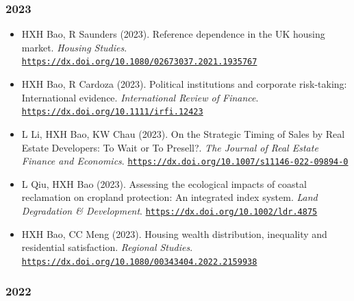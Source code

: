 \documentclass[11pt,a4paper]{article}
\providecommand{\tightlist}{%
  \setlength{\itemsep}{1pt}\setlength{\parskip}{0pt}}
\begin{document}
\subsubsection{2023}\label{section-3}

\begin{itemize}
\tightlist
\item
  HXH Bao, R Saunders (2023). Reference dependence in the UK housing
  market. \emph{Housing Studies}.
  \href{https://dx.doi.org/10.1080/02673037.2021.1935767}{\nolinkurl{https://dx.doi.org/10.1080/02673037.2021.1935767}}
\item
  HXH Bao, R Cardoza (2023). Political institutions and corporate
  risk-taking: International evidence. \emph{International Review of
  Finance}.
  \href{https://dx.doi.org/10.1111/irfi.12423}{\nolinkurl{https://dx.doi.org/10.1111/irfi.12423}}
\item
  L Li, HXH Bao, KW Chau (2023). On the Strategic Timing of Sales by
  Real Estate Developers: To Wait or To Presell?. \emph{The Journal of
  Real Estate Finance and Economics}.
  \href{https://dx.doi.org/10.1007/s11146-022-09894-0}{\nolinkurl{https://dx.doi.org/10.1007/s11146-022-09894-0}}
\item
  L Qiu, HXH Bao (2023). Assessing the ecological impacts of coastal
  reclamation on cropland protection: An integrated index system.
  \emph{Land Degradation \& Development}.
  \href{https://dx.doi.org/10.1002/ldr.4875}{\nolinkurl{https://dx.doi.org/10.1002/ldr.4875}}
\item
  HXH Bao, CC Meng (2023). Housing wealth distribution, inequality and
  residential satisfaction. \emph{Regional Studies}.
  \href{https://dx.doi.org/10.1080/00343404.2022.2159938}{\nolinkurl{https://dx.doi.org/10.1080/00343404.2022.2159938}}
\end{itemize}

\subsubsection{2022}\label{section-4}
\end{document}
